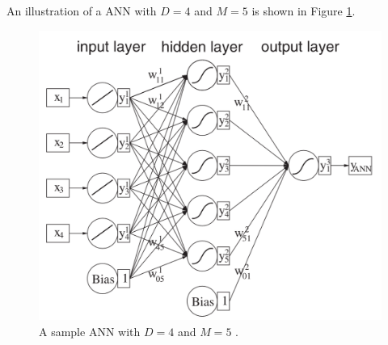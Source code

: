An illustration of a \gls{ANN} with $D=4$ and $M=5$ is shown in Figure \ref{fig:nn}. 

\begin{figure}[!ht] 
    \centering
    \includegraphics[width=.7\textwidth]{appendices/images/neural_network.png}
    \caption[A sample \gls{ANN} with $D=4$ and $M=5$]{A sample \gls{ANN} with $D=4$ and $M=5$ \cite{data-analysis}.}
    \label{fig:nn}
\end{figure}

